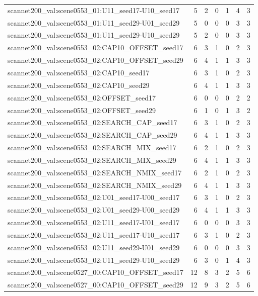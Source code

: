 \begin{table}[t]
\begin{tabular}{lrrrrrr}
scannet200\_val:scene0553\_01:U11\_seed17-U10\_seed17 & 5 & 2 & 0 & 1 & 4 & 3 \\
scannet200\_val:scene0553\_01:U11\_seed29-U01\_seed29 & 5 & 0 & 0 & 0 & 3 & 3 \\
scannet200\_val:scene0553\_01:U11\_seed29-U10\_seed29 & 5 & 2 & 0 & 0 & 3 & 3 \\
scannet200\_val:scene0553\_02:CAP10\_OFFSET\_seed17 & 6 & 3 & 1 & 0 & 2 & 3 \\
scannet200\_val:scene0553\_02:CAP10\_OFFSET\_seed29 & 6 & 4 & 1 & 1 & 3 & 3 \\
scannet200\_val:scene0553\_02:CAP10\_seed17 & 6 & 3 & 1 & 0 & 2 & 3 \\
scannet200\_val:scene0553\_02:CAP10\_seed29 & 6 & 4 & 1 & 1 & 3 & 3 \\
scannet200\_val:scene0553\_02:OFFSET\_seed17 & 6 & 0 & 0 & 0 & 2 & 2 \\
scannet200\_val:scene0553\_02:OFFSET\_seed29 & 6 & 1 & 0 & 1 & 3 & 2 \\
scannet200\_val:scene0553\_02:SEARCH\_CAP\_seed17 & 6 & 3 & 1 & 0 & 2 & 3 \\
scannet200\_val:scene0553\_02:SEARCH\_CAP\_seed29 & 6 & 4 & 1 & 1 & 3 & 3 \\
scannet200\_val:scene0553\_02:SEARCH\_MIX\_seed17 & 6 & 2 & 1 & 0 & 2 & 3 \\
scannet200\_val:scene0553\_02:SEARCH\_MIX\_seed29 & 6 & 4 & 1 & 1 & 3 & 3 \\
scannet200\_val:scene0553\_02:SEARCH\_NMIX\_seed17 & 6 & 2 & 1 & 0 & 2 & 3 \\
scannet200\_val:scene0553\_02:SEARCH\_NMIX\_seed29 & 6 & 4 & 1 & 1 & 3 & 3 \\
scannet200\_val:scene0553\_02:U01\_seed17-U00\_seed17 & 6 & 3 & 1 & 0 & 2 & 3 \\
scannet200\_val:scene0553\_02:U01\_seed29-U00\_seed29 & 6 & 4 & 1 & 1 & 3 & 3 \\
scannet200\_val:scene0553\_02:U11\_seed17-U01\_seed17 & 6 & 0 & 0 & 0 & 3 & 3 \\
scannet200\_val:scene0553\_02:U11\_seed17-U10\_seed17 & 6 & 3 & 1 & 0 & 2 & 3 \\
scannet200\_val:scene0553\_02:U11\_seed29-U01\_seed29 & 6 & 0 & 0 & 0 & 3 & 3 \\
scannet200\_val:scene0553\_02:U11\_seed29-U10\_seed29 & 6 & 3 & 0 & 1 & 4 & 3 \\
scannet200\_val:scene0527\_00:CAP10\_OFFSET\_seed17 & 12 & 8 & 3 & 2 & 5 & 6 \\
scannet200\_val:scene0527\_00:CAP10\_OFFSET\_seed29 & 12 & 9 & 3 & 2 & 5 & 6 \\

\end{tabular}
\end{table}
